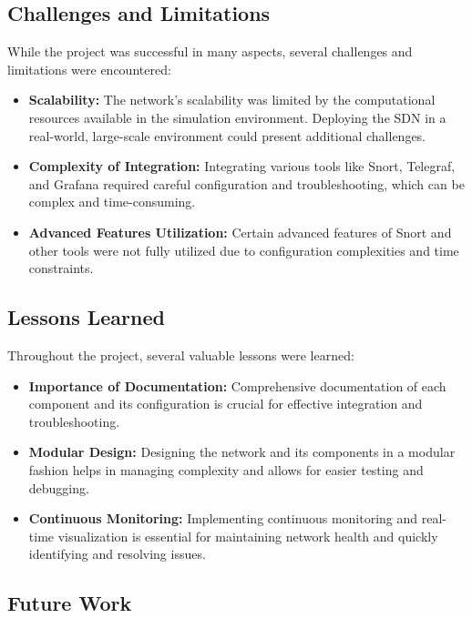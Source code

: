 \documentclass[a4paper,12pt]{article}
\begin{document}
\subsection{Challenges and Limitations}

While the project was successful in many aspects, several challenges and limitations were encountered:
\begin{itemize}
    \item \textbf{Scalability:} The network's scalability was limited by the computational resources available in the simulation environment. Deploying the SDN in a real-world, large-scale environment could present additional challenges.
    \item \textbf{Complexity of Integration:} Integrating various tools like Snort, Telegraf, and Grafana required careful configuration and troubleshooting, which can be complex and time-consuming.
    \item \textbf{Advanced Features Utilization:} Certain advanced features of Snort and other tools were not fully utilized due to configuration complexities and time constraints.
\end{itemize}

\subsection{Lessons Learned}

Throughout the project, several valuable lessons were learned:
\begin{itemize}
    \item \textbf{Importance of Documentation:} Comprehensive documentation of each component and its configuration is crucial for effective integration and troubleshooting.
    \item \textbf{Modular Design:} Designing the network and its components in a modular fashion helps in managing complexity and allows for easier testing and debugging.
    \item \textbf{Continuous Monitoring:} Implementing continuous monitoring and real-time visualization is essential for maintaining network health and quickly identifying and resolving issues.
\end{itemize}

\subsection{Future Work}
\end{document}
